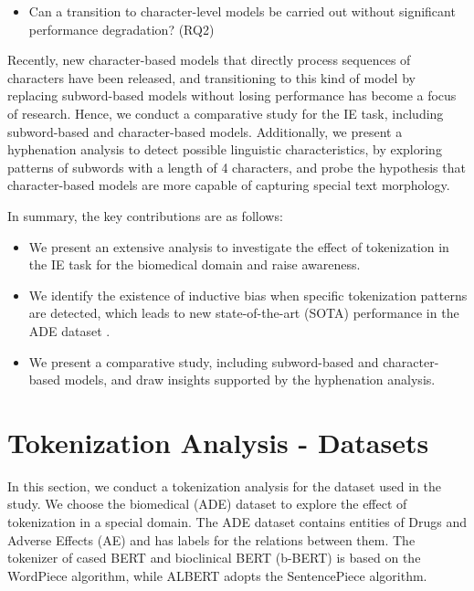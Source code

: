 \documentclass[runningheads]{llncs}
\begin{document}
\begin{itemize}
    \vspace{-3mm}
    \item Can a transition to character-level models be carried out without significant performance degradation? (RQ2)
    \vspace{-3mm}
\end{itemize}

Recently, new character-based models \cite{el-boukkouri-etal-2020-characterbert,clark-etal-2022-canine,xue-etal-2022-byt5,tay2021charformer} that directly process sequences of characters have been released, and transitioning to this kind of model by replacing subword-based models without losing performance has become a focus of research. Hence, we conduct a comparative study for the IE task, including subword-based and character-based models. Additionally, we present a hyphenation analysis to detect possible linguistic characteristics, by exploring patterns of subwords with a length of 4 characters, and probe the hypothesis that character-based models are more capable of capturing special text morphology.

In summary, the key contributions are as follows:

\begin{itemize}
    \vspace{-3.5mm}
    \item We present an extensive analysis to investigate the effect of tokenization in the IE task for the biomedical domain and raise awareness.
    \item We identify the existence of inductive bias when specific tokenization patterns are detected, which leads to new state-of-the-art (SOTA) performance in the ADE dataset \cite{gurulingappa2012development}.
    \item We present a comparative study, including subword-based and character-based models, and draw insights supported by the hyphenation analysis.
    \vspace{-6mm}
\end{itemize}

\section{Tokenization Analysis - Datasets}
\vspace{-4mm}
In this section, we conduct a tokenization analysis for the dataset used in the study. We choose the biomedical (ADE) dataset to explore the effect of tokenization in a special domain. The ADE dataset contains entities of Drugs and Adverse Effects (AE) and has labels for the relations between them. The tokenizer of cased BERT \cite{devlin-etal-2019-bert} and bioclinical BERT (b-BERT) \cite{alsentzer-etal-2019-publicly} is based on the WordPiece algorithm, while ALBERT \cite{lan2019albert} adopts the SentencePiece algorithm.
\end{document}
